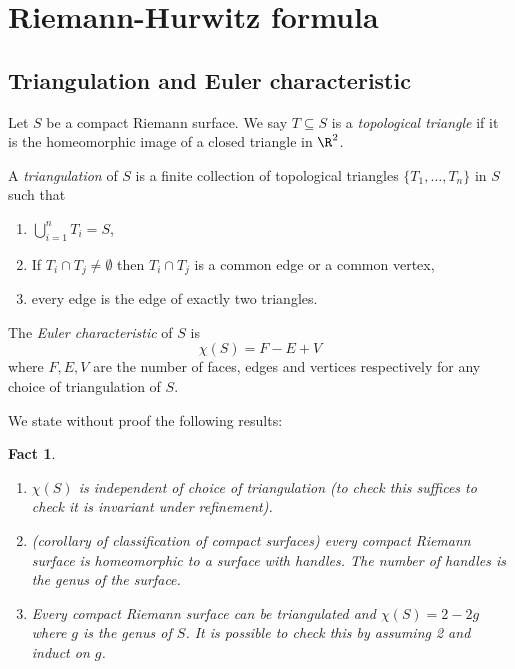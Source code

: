 \documentclass[a4paper]{article}
\newtheorem*{fact}{Fact}
\begin{document}
\section{Riemann-Hurwitz formula}

\subsection{Triangulation and Euler characteristic}

Let \(S\) be a compact Riemann surface. We say \(T \subseteq S\) is a \emph{topological triangle} if it is the homeomorphic image of a closed triangle in \(\R^2\).

\begin{definition}[triangulation]
  A \emph{triangulation} of \(S\) is a finite collection of topological triangles \(\{T_1, \dots, T_n\}\) in \(S\) such that
  \begin{enumerate}
  \item \(\bigcup_{i = 1}^n T_i = S\),
  \item If \(T_i \cap T_j \neq \emptyset\) then \(T_i \cap T_j\) is a common edge or a common vertex,
  \item every edge is the edge of exactly two triangles.
  \end{enumerate}
\end{definition}

\begin{definition}
  The \emph{Euler characteristic} of \(S\) is
  \[
    \chi(S) = F - E + V
  \]
  where \(F, E, V\) are the number of faces, edges and vertices respectively for any choice of triangulation of \(S\).
\end{definition}

We state without proof the following results:
\begin{fact}\leavevmode
  \begin{enumerate}
  \item \(\chi(S)\) is independent of choice of triangulation (to check this suffices to check it is invariant under refinement).
  \item (corollary of classification of compact surfaces) every compact Riemann surface is homeomorphic to a surface with handles. The number of handles is the \emph{genus} of the surface.
  \item Every compact Riemann surface can be triangulated and \(\chi(S) = 2 - 2g\) where \(g\) is the genus of \(S\). It is possible to check this by assuming 2 and induct on \(g\).
  \end{enumerate}
\end{fact}
\end{document}
